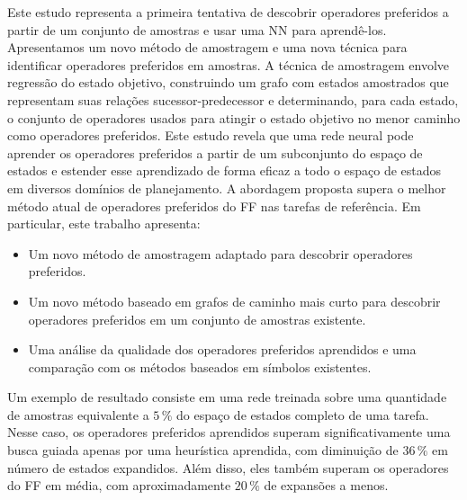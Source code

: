 \documentclass[ppgc,diss,english]{iiufrgs}
\begin{document}
Este estudo representa a primeira tentativa de descobrir operadores preferidos a partir de um conjunto de amostras e usar uma NN para aprendê-los. Apresentamos um novo método de amostragem e uma nova técnica para identificar operadores preferidos em amostras. A técnica de amostragem envolve regressão do estado objetivo, construindo um grafo com estados amostrados que representam suas relações sucessor-predecessor e determinando, para cada estado, o conjunto de operadores usados para atingir o estado objetivo no menor caminho como operadores preferidos. Este estudo revela que uma rede neural pode aprender os operadores preferidos a partir de um subconjunto do espaço de estados e estender esse aprendizado de forma eficaz a todo o espaço de estados em diversos domínios de planejamento. A abordagem proposta supera o melhor método atual de operadores preferidos do FF nas tarefas de referência. Em particular, este trabalho apresenta:

\begin{itemize}
\item Um novo método de amostragem adaptado para descobrir operadores preferidos.
\item Um novo método baseado em grafos de caminho mais curto para descobrir operadores preferidos em um conjunto de amostras existente.
\item Uma análise da qualidade dos operadores preferidos aprendidos e uma comparação com os métodos baseados em símbolos existentes.
\end{itemize}

Um exemplo de resultado consiste em uma rede treinada sobre uma quantidade de amostras equivalente a $5\,\%$ do espaço de estados completo de uma tarefa. Nesse caso, os operadores preferidos aprendidos superam significativamente uma busca guiada apenas por uma heurística aprendida, com diminuição de $36\,\%$ em número de estados expandidos. Além disso, eles também superam os operadores do FF em média, com aproximadamente $20\,\%$ de expansões a menos.
\end{document}
